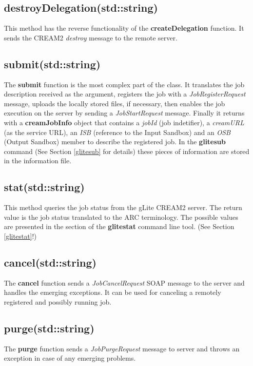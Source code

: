 \documentclass{article}
\begin{document}
\subsection{destroyDelegation(std::string)}
This method has the reverse functionality of the \textbf{createDelegation} function. It sends the CREAM2 \textit{destroy} message to the remote server.
\subsection{submit(std::string)}
The \textbf{submit} function is the most complex part of the class. It translates the job description received as the argument, registers the job with a \textit{JobRegisterRequest} message, uploads the locally stored files, if necessary, then enables the job execution on the server by sending a \textit{JobStartRequest} message. Finally it returns with a \textbf{creamJobInfo} object that contains a \textit{jobId} (job indetifier), a \textit{creamURL} (as the service URL), an \textit{ISB} (reference to the Input Sandbox) and an \textit{OSB} (Output Sandbox) member to describe the registered job. In the \textbf{glitesub} command (See Section \ref{glitesub} for details) these pieces of information are stored in the information file.
\subsection{stat(std::string)}
This method queries the job status from the gLite CREAM2 server. The return value is the job status translated to the ARC terminology. The possible values are presented in the section of the \textbf{glitestat} command line tool. (See Section \ref{glitestat}!)
\subsection{cancel(std::string)}
The \textbf{cancel} function sends a \textit{JobCancelRequest} SOAP message to the server and handles the emerging exceptions. It can be used for canceling a remotely registered and possibly running job.
\subsection{purge(std::string)}
The \textbf{purge} function sends a \textit{JobPurgeRequest} message to server and throws an exception in case of any emerging problems.
\end{document}

